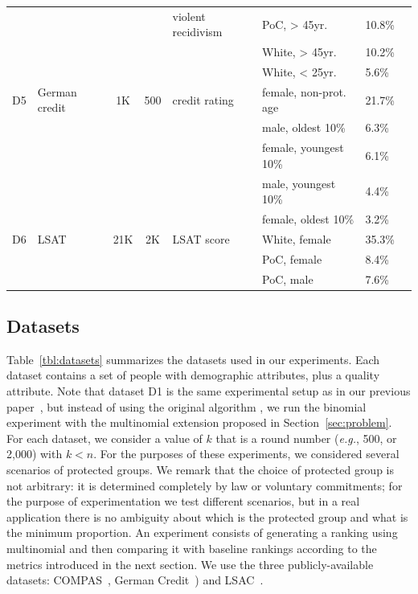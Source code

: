 \begin{table}[t]
{\begin{tabular}{clcclllc}
			& & & & violent recidivism & PoC, > 45yr. & 10.8\% \\
			& & & & & White, > 45yr. & 10.2\% \\
			& & & & & White, < 25yr. & 5.6\% \\
			\midrule
			D5 & German credit \cite{lichman_2013_uci} & 1K & 500 & credit rating & female, non-prot. age & 21.7\% \\
			& & & & & male, oldest 10\% & 6.3\% \\
			& & & & & female, youngest 10\% & 6.1\% \\
			& & & & & male, youngest 10\% & 4.4\% \\
			& & & & & female, oldest 10\% & 3.2\% \\
			\midrule
			D6 & LSAT \cite{wightman1998lsac}  & 21K & 2K  & LSAT score  & White, female & 35.3\%  \\ 
			& & & & & PoC, female & 8.4\% \\
			& & & & & PoC, male & 7.6\% \\
			\bottomrule
		\end{tabular}
	}
	\vspace{-3mm}
\end{table}

\subsection{Datasets}\label{sec:experiments-datasets}

Table~\ref{tbl:datasets} summarizes the datasets used in our experiments.
%
Each dataset contains a set of people with demographic attributes, plus a quality attribute.
%
Note that dataset D1 is the same experimental setup as in our previous paper~\cite{zehlike2017fair}, but instead of using the original algorithm \algoFAIR, we run the binomial experiment with the multinomial extension proposed in Section~\ref{sec:problem}.
%
For each dataset, we consider a value of $k$ that is a round number ({\em e.g.}, 500, or 2,000) with $k<n$.
%
For the purposes of these experiments, we considered several scenarios of protected groups.
%
We remark that the choice of protected group is not arbitrary: it is determined completely by law or voluntary commitments; for the purpose of experimentation we test different scenarios, but in a real application there is no ambiguity about which is the protected group and what is the minimum proportion.
%
An experiment consists of generating a ranking using multinomial \algoFAIR and then comparing it with baseline rankings according to the metrics introduced in the next section.
%
We use the three publicly-available datasets: COMPAS~\cite{angwin_2016_machine}, German Credit~\cite{lichman_2013_uci}) and LSAC~\cite{wightman1998lsac}.

